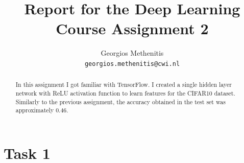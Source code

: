 \documentclass{article}
\title{Report for the Deep Learning Course Assignment 2 }
\author{
  Georgios Methenitis \\
  \texttt{georgios.methenitis@cwi.nl}
}
\begin{document}

\maketitle

\begin{abstract}
In this assignment I got familiar with TensorFlow. I created a single hidden layer network with ReLU activation function to learn features for the CIFAR10 dataset.
Similarly to the previous assignment, the accuracy obtained in the test set was approximately $0.46$.
\end{abstract}

\section{Task 1}
\end{document}
